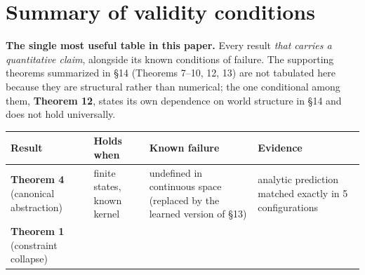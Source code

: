 \documentclass[11pt]{article}
\begin{document}
\hypertarget{summary-of-validity-conditions}{%
\section{Summary of validity conditions}\label{summary-of-validity-conditions}}

\textbf{The single most useful table in this paper.} Every result \emph{that carries a quantitative claim}, alongside its known conditions of failure. The supporting theorems summarized in \S{}14 (Theorems 7--10, 12, 13) are not tabulated here because they are structural rather than numerical; the one conditional among them, \textbf{Theorem 12}, states its own dependence on world structure in \S{}14 and does not hold universally.

\begin{longtable}[]{@{}llll@{}}
\toprule
\begin{minipage}[b]{0.22\columnwidth}\raggedright
Result\strut
\end{minipage} & \begin{minipage}[b]{0.22\columnwidth}\raggedright
Holds when\strut
\end{minipage} & \begin{minipage}[b]{0.22\columnwidth}\raggedright
Known failure\strut
\end{minipage} & \begin{minipage}[b]{0.22\columnwidth}\raggedright
Evidence\strut
\end{minipage}\tabularnewline
\midrule
\endhead
\begin{minipage}[t]{0.22\columnwidth}\raggedright
\textbf{Theorem 4} (canonical abstraction)\strut
\end{minipage} & \begin{minipage}[t]{0.22\columnwidth}\raggedright
finite states, known kernel\strut
\end{minipage} & \begin{minipage}[t]{0.22\columnwidth}\raggedright
undefined in continuous space (replaced by the learned version of \S{}13)\strut
\end{minipage} & \begin{minipage}[t]{0.22\columnwidth}\raggedright
analytic prediction matched exactly in 5 configurations\strut
\end{minipage}\tabularnewline
\begin{minipage}[t]{0.22\columnwidth}\raggedright
\textbf{Theorem 1} (constraint collapse)\strut
\end{minipage} & \begin{minipage}[t]{0.22\columnwidth}\raggedright

\end{minipage}
\end{longtable}
\end{document}
